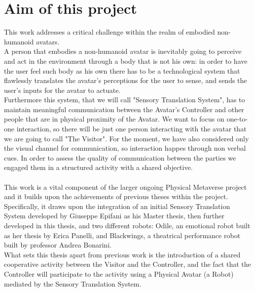 \documentclass{Configuration_Files/PoliMi3i_thesis}
\begin{document}
\section{Aim of this project}
This work addresses a critical challenge within the realm of embodied non-humanoid avatars.
\\A person that embodies a non-humanoid avatar is inevitably going to perceive and act in the environment through a body that is not his own: in order to have the user feel such body as his own there has to be a technological system that flawlessly translates the avatar's perceptions for the user to sense, and sends the user's inputs for the avatar to actuate.
\\Furthermore this system, that we will call "Sensory Translation System", has to maintain meaningful communication between the Avatar's Controller and other people that are in physical proximity of the Avatar.
We want to focus on one-to-one interaction, so there will be just one person interacting with the avatar that we are going to call "The Visitor". For the moment, we have also considered only the visual channel for communication, so interaction happes through non verbal cues. In order to assess the quality of communication between the parties we engaged them in a structured activity with a shared objective.
\\
\\
This work is a vital component of the larger ongoing Physical Metaverse project and it builds upon the achievements of previous theses within the project. Specifically, it draws upon the integration of an initial  Sensory Translation System developed by Giuseppe Epifani as his Master thesis, then further developed in this thesis, and two different robots: Odile, an emotional robot built as her thesis by Erica Panelli, and Blackwings, a theatrical performance robot built by professor Andrea Bonarini.
\\What sets this thesis apart from previous work is the introduction of a shared cooperative activity between the Visitor and the Controller, and the fact that the Controller will participate to the activity using a Physical Avatar (a Robot) mediated by the Sensory Translation System.
\\
\end{document}
